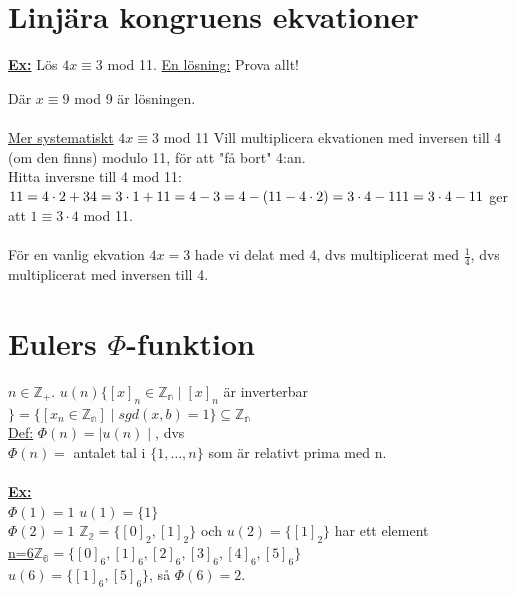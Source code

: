 \documentclass{article}
\begin{document}
    \section{Linjära kongruens ekvationer}
    \underline{\textbf{Ex:}} Lös $4x\equiv 3$ mod 11.
    \indent \underline{En lösning:} Prova allt!\\

    \indent Där $x\equiv 9$ mod 9 är lösningen.\\\\
    \indent \underline{Mer systematiskt} $4x\equiv 3$ mod 11
    \indent Vill multiplicera ekvationen med inversen till 4 (om den finns) modulo 11,
    för att "få bort" 4:an.\\
    Hitta inversne till 4 mod 11:\\
    $11=4\cdot 2+3\\
    4=3\cdot 1+1\\
    1=4-3=4-(11-4\cdot 2)=3\cdot 4-11\\
    1=3\cdot 4-11$ ger att $1\equiv 3\cdot 4$ mod 11.\\\\
    För en vanlig ekvation $4x=3$ hade vi delat med 4, dvs multiplicerat med $\frac{1}{4}$, dvs multiplicerat med inversen till 4.

    \section{Eulers $\Phi$-funktion}
    $n\in \mathbb{Z_{+}}$. $u(n)\{[x]_{n}\in \mathbb{Z_{n}} \mid [x]_{n}$ är inverterbar $\}=\{[x_{n}\in \mathbb{Z_{n}}]\mid sgd(x,b)=1\}\subseteq \mathbb{Z_{n}}$\\
    \underline{Def:} $\Phi (n) = \mid u(n) \mid$, dvs\\
    \indent $\Phi (n)=$ antalet tal i $\{1, \ldots, n\}$ som är relativt prima med n.\\\\
    \underline{\textbf{Ex:}}\\
    $\Phi (1) = 1$ $u(1)=\{1\}$\\
    $\Phi (2) = 1$ $\mathbb{Z_{2}}=\{[0]_{2}, [1]_{2}\}$ och $u(2)=\{[1]_{2}\}$ har ett element\\
    \underline{n=6}\indent $\mathbb{Z_{6}}=\{[0]_{6},[1]_{6},[2]_{6},[3]_{6},[4]_{6},[5]_{6}\}$\\
    \indent $u(6)=\{[1]_{6}, [5]_{6}\}$, så $\Phi (6)=2$.
\end{document}
